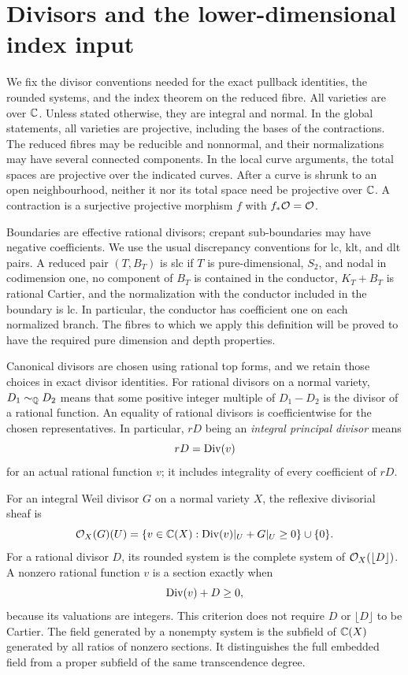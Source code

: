 \section{Divisors and the lower-dimensional index input}
\label{sec:preliminaries}

We fix the divisor conventions needed for the exact pullback identities,
the rounded systems, and the index theorem on the reduced fibre.
All varieties are over $\mathbb C$.  Unless stated otherwise, they are integral
and normal.  In the global statements, all varieties are projective,
including the bases of the contractions.  The reduced fibres may be
reducible and nonnormal, and their normalizations may have several
connected components.  In the local curve arguments, the total spaces
are projective over the indicated curves.  After a curve is shrunk to
an open neighbourhood, neither it nor its total space need be projective
over $\mathbb C$.  A contraction is a surjective projective morphism $f$ with
$f_*\mathcal O=\mathcal O$.

Boundaries are effective rational divisors; crepant sub-boundaries may
have negative coefficients.  We use the usual discrepancy conventions
for lc, klt, and dlt pairs.  A reduced pair $(T,B_T)$ is slc if $T$ is
pure-dimensional, $S_2$, and nodal in codimension one, no component of
$B_T$ is contained in the conductor, $K_T+B_T$ is rational Cartier, and
the normalization with the conductor included in the boundary is lc.  In
particular, the conductor has coefficient one on each normalized branch.
The fibres to which we apply this definition will be proved to have the
required pure dimension and depth properties.

Canonical divisors are chosen using rational top forms, and we retain
those choices in exact divisor identities.  For rational divisors on a
normal variety, $D_1\sim_\mathbb Q D_2$ means that some positive integer multiple of
$D_1-D_2$ is the divisor of a rational function.  An equality of
rational divisors is coefficientwise for the chosen representatives.
In particular, $rD$ being an \emph{integral principal
divisor} means
\[
 rD=\operatorname{Div}(v)
\]
for an actual rational function $v$; it includes integrality of every
coefficient of $rD$.

For an integral Weil divisor $G$ on a normal variety $X$, the reflexive
divisorial sheaf is
\[
 \mathcal O_X(G)(U)=\{v\in\mathbb C(X):\operatorname{Div}(v)|_U+G|_U\geq0\}\cup\{0\}.
\]
For a rational divisor $D$, its rounded system is the complete system of
$\mathcal O_X(\lfloor D\rfloor)$.  A nonzero rational function $v$ is a section
exactly when
\[
 \operatorname{Div}(v)+D\geq0,
\]
because its valuations are integers.  This criterion does not require
$D$ or $\lfloor D\rfloor$ to be Cartier.  The field generated by a
nonempty system is the subfield of $\mathbb C(X)$ generated by all ratios of
nonzero sections.  It distinguishes the full embedded field from a
proper subfield of the same transcendence degree.

